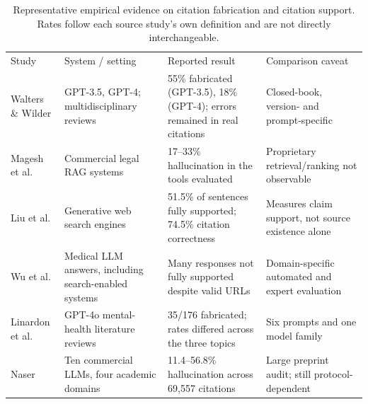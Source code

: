 \begin{table}[htbp]\caption{Representative empirical evidence on citation fabrication and citation support. Rates follow each source study’s own definition and are not directly interchangeable.}\centering\footnotesize\setlength{\tabcolsep}{2pt}\begin{tabular}{@{}p{.18\linewidth}p{.24\linewidth}p{.28\linewidth}p{.25\linewidth}@{}}\toprule
Study & System / setting & Reported result & Comparison caveat \\
Walters \& Wilder \cite{ref22} & GPT-3.5, GPT-4; multidisciplinary reviews & 55\% fabricated (GPT-3.5), 18\% (GPT-4); errors remained in real citations & Closed-book, version- and prompt-specific \\
Magesh et al. \cite{ref14} & Commercial legal RAG systems & 17–33\% hallucination in the tools evaluated & Proprietary retrieval/ranking not observable \\
Liu et al. \cite{ref13} & Generative web search engines & 51.5\% of sentences fully supported; 74.5\% citation correctness & Measures claim support, not source existence alone \\
Wu et al. \cite{ref23} & Medical LLM answers, including search-enabled systems & Many responses not fully supported despite valid URLs & Domain-specific automated and expert evaluation \\
Linardon et al. \cite{ref12} & GPT-4o mental-health literature reviews & 35/176 fabricated; rates differed across the three topics & Six prompts and one model family \\
Naser \cite{ref18} & Ten commercial LLMs, four academic domains & 11.4–56.8\% hallucination across 69,557 citations & Large preprint audit; still protocol-dependent \\\bottomrule\end{tabular}\end{table}